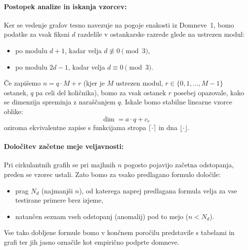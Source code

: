 \documentclass[a4paper,12pt]{article}
\theoremstyle{definition}
\begin{document}
\paragraph{Postopek analize in iskanja vzorcev:}
Ker se vedenje grafov tesno navezuje na pogoje enakosti iz Domneve~1, bomo podatke za vsak fiksni $d$ razdelile v 
ostankarske razrede glede na ustrezen modul:
\begin{itemize}
    \item po modulu $d + 1$, kadar velja $d \not\equiv 0 \pmod 3$,
    \item po modulu $2d - 1$, kadar velja $d \equiv 0 \pmod 3$.
\end{itemize}
Če zapišemo $n = q \cdot M + r$ (kjer je $M$ ustrezen modul, $r \in \{0, 1, \dots, M-1\}$ ostanek, $q$ pa celi del 
količnika), bomo za vsak ostanek $r$ posebej opazovale, kako se dimenzija spreminja z naraščanjem $q$. Iskale bomo 
stabilne linearne vzorce oblike:
\[
\operatorname{dim} = a \cdot q + c_r
\]
oziroma ekvivalentne zapise s funkcijama stropa $\lceil \cdot \rceil$ in dna $\lfloor \cdot \rfloor$.

\paragraph{Določitev začetne meje veljavnosti:}
Pri cirkulantnih grafih se pri majhnih $n$ pogosto pojavijo začetna odstopanja, preden se vzorec ustali. Zato bomo za 
vsako predlagano formulo določile:
\begin{itemize}
    \item prag $N_d$ (najmanjši $n$), od katerega naprej predlagana formula velja za vse testirane primere brez izjeme,
    \item natančen seznam vseh odstopanj (anomalij) pod to mejo ($n < N_d$).
\end{itemize}

Vse tako dobljene formule bomo v končnem poročilu predstavile s tabelami in grafi ter jih jasno označile kot empirično 
podprte domneve.
\end{document}

